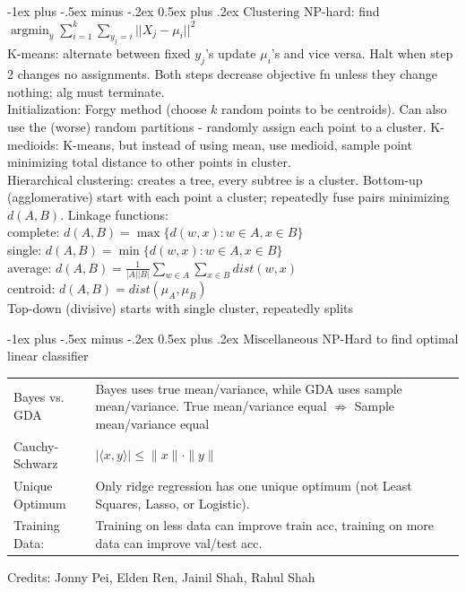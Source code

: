 \documentclass[10pt,landscape]{article}
\makeatletter
\DeclareMathOperator*{\argmin}{argmin}
\renewcommand{\section}{\@startsection{section}{1}{0mm}%
                                {-1ex plus -.5ex minus -.2ex}%
                                {0.5ex plus .2ex}%
                                {\normalfont\large\bfseries}}
\makeatother
\begin{document}
\begin{multicols}{3}
\section{$\boxed{\text{Clustering}}$}
NP-hard: find $\argmin_y \sum_{i=1}^k \sum_{y_j=i} ||X_j -\mu_i||^2$\\
K-means: alternate between fixed $y_j$'s update $\mu_i$'s and vice versa. Halt when step 2 changes no assignments. Both steps decrease objective fn unless they change nothing; alg must terminate.\\
Initialization: Forgy method (choose $k$ random points to be centroids). Can also use the (worse) random partitions - randomly assign each point to a cluster.
K-medioids: K-means, but instead of using mean, use medioid, sample point minimizing total distance to other points in cluster.\\
Hierarchical clustering: creates a tree, every subtree is a cluster. Bottom-up (agglomerative) start with each point a cluster; repeatedly fuse pairs minimizing $d(A, B)$. Linkage functions: \\
complete: $d(A, B) = \max \{ d(w, x) : w \in A, x \in B \}$\\
single: $d(A, B) = \min \{d(w, x): w \in A, x \in B \}$\\
average:  $d(A, B) = \frac{1}{|A||B|}\sum_{w \in A} \sum_{x \in B} dist(w, x)$\\
centroid: $d(A, B) = dist(\mu_A, \mu_B)$\\
Top-down (divisive) starts with single cluster, repeatedly splits

\section{$\boxed{\text{Miscellaneous}}$}
NP-Hard to find optimal linear classifier
\begin{tabular}{@{}p{\the\MyLen}%
                @{}p{\linewidth-\the\MyLen}@{}}
Bayes vs. GDA & Bayes uses true mean/variance, while GDA uses sample mean/variance. True mean/variance equal $\not \Rightarrow$ Sample mean/variance equal\\

Cauchy-Schwarz &  $|\langle x, y \rangle | \leq \| x \| \cdot \| y \|$  \\
Unique Optimum & Only ridge regression has one unique optimum (not Least Squares, Lasso, or Logistic).\\
Training Data: & Training on less data can improve train acc, training on more data can improve val/test acc.\\
\end{tabular}
\tiny{Credits: Jonny Pei, Elden Ren, Jainil Shah, Rahul Shah}
\end{multicols}
\end{document}
